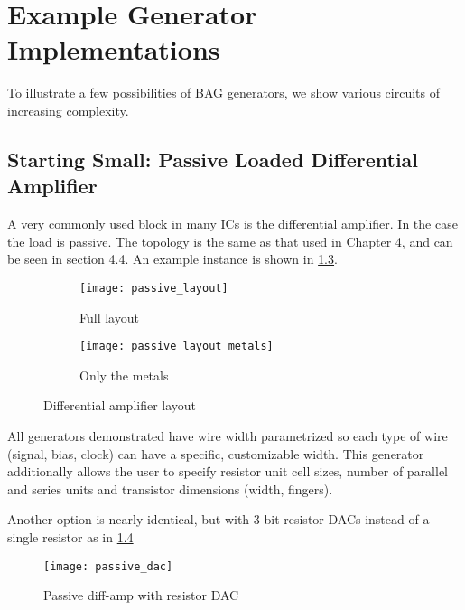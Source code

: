 \chapter{Example Generator Implementations}
To illustrate a few possibilities of BAG generators, we show various circuits of increasing complexity. 
\section{Starting Small: Passive Loaded Differential Amplifier}
A very commonly used block in many ICs is the differential amplifier. In the case the load is passive. The topology is the same as that used in Chapter 4, and can be seen in section 4.4. An example instance is shown in \ref{fig:passive_amp}.
\begin{figure}[h]
\centering
\begin{subfigure}{.8\linewidth}
  \centering
  \texttt{[image: passive\_layout]}
  \caption{Full layout}
  \label{fig:sfig1}
\end{subfigure}
\begin{subfigure}{.8\linewidth}
  \centering
\texttt{[image: passive\_layout\_metals]}
  \caption{Only the metals}
  \label{fig:sfig2}
\end{subfigure}
\caption{Differential amplifier layout}
\label{fig:passive_amp}
\end{figure}
\clearpage
All generators demonstrated have wire width parametrized so each type of wire (signal, bias, clock) can have a specific, customizable width. This generator additionally allows the user to specify resistor unit cell sizes, number of parallel and series units and transistor dimensions (width, fingers).

Another option is nearly identical, but with 3-bit resistor DACs instead of a single resistor as in \ref{fig:passive_dac}
\begin{figure}[h]
\centering
\texttt{[image: passive\_dac]}
\caption{Passive diff-amp with resistor DAC}
\label{fig:passive_dac}
\end{figure}

